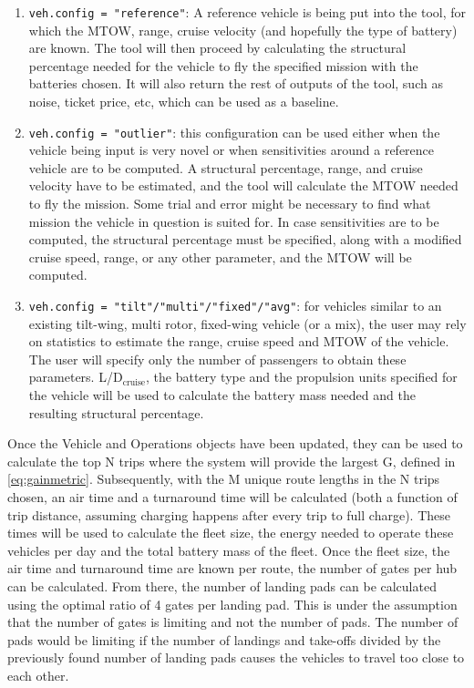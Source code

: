 \begin{enumerate}[nolistsep]
    \item \texttt{veh.config = "reference"}: A reference vehicle is being put into the tool, for which the MTOW, range, cruise velocity (and hopefully the type of battery) are known. The tool will then proceed by calculating the structural percentage needed for the vehicle to fly the specified mission with the batteries chosen. It will also return the rest of outputs of the tool, such as noise, ticket price, etc, which can be used as a baseline.
    \item \texttt{veh.config = "outlier"}: this configuration can be used either when the vehicle being input is very novel or when sensitivities around a reference vehicle are to be computed. A structural percentage, range, and cruise velocity have to be estimated, and the tool will calculate the MTOW needed to fly the mission. Some trial and error might be necessary to find what mission the vehicle in question is suited for. In case sensitivities are to be computed, the structural percentage must be specified, along with a modified cruise speed, range, or any other parameter, and the MTOW will be computed.
    \item \texttt{veh.config = "tilt"/"multi"/"fixed"/"avg"}: for vehicles similar to an existing tilt-wing, multi rotor, fixed-wing vehicle (or a mix), the user may rely on statistics to estimate the range, cruise speed and MTOW of the vehicle. The user will specify only the number of passengers to obtain these parameters. L/D$_{\text{cruise}}$, the battery type and the propulsion units specified for the vehicle will be used to calculate the battery mass needed and the resulting structural percentage.
    
\end{enumerate}


Once the Vehicle and Operations objects have been updated, they can be used to calculate the top N trips where the  system will provide the largest G, defined in \autoref{eq:gainmetric}. Subsequently, with the M unique route lengths in the N trips chosen, an air time and a turnaround time will be calculated (both a function of trip distance, assuming charging happens after every trip to full charge). These times will be used to calculate the fleet size, the energy needed to operate these vehicles per day and the total battery mass of the fleet. Once the fleet size, the air time and turnaround time are known per route, the number of gates per hub can be calculated. From there, the number of landing pads can be calculated using the optimal ratio of 4 gates per landing pad. This is under the assumption that the number of gates is limiting and not the number of pads. The number of pads would be limiting if the number of landings and take-offs divided by the previously found number of landing pads causes the vehicles to travel too close to each other.

